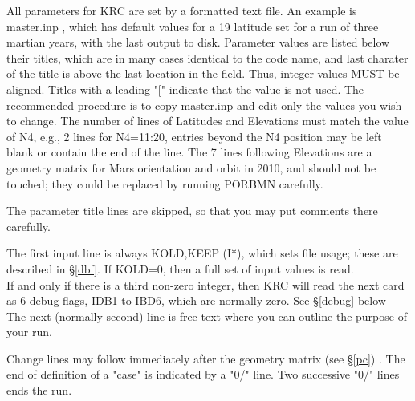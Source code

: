 \documentclass[draft]{article}  %
\newcommand{\qi}{\\ \hspace*{2.em}}      %
\begin{document}
All parameters for KRC are set by a formatted text file.  An example is
master.inp , which has default values for a 19 latitude set for a run of three
martian years, with the last output to disk. Parameter values are listed below
their titles, which are in many cases identical to the code name, and last
charater of the title is above the last location in the field. Thus, integer
values MUST be aligned. Titles with a leading "[" indicate that the value is not
used. The recommended procedure is to copy master.inp and edit only the values
you wish to change. The number of lines of Latitudes and Elevations must match
the value of N4, e.g., 2 lines for N4=11:20, entries beyond the N4 position may
be left blank or contain the end of the line. The 7 lines following Elevations
are a geometry matrix for Mars orientation and orbit in 2010, and should not be
touched; they could be replaced by running PORBMN carefully.

The parameter title lines are skipped, so that you may put comments there carefully.

The first input line is always KOLD,KEEP (I*), which sets file usage; these are
described in \S \ref{dbf}. If KOLD=0, then a full set of input values is read.
\qi If and only if there is a third non-zero integer, then KRC will read the next
card as 6 debug flags, IDB1 to IBD6, which are normally zero.
  See \S \ref{debug} below \\
The next (normally second) line is free text where you can outline the purpose 
of your run.

Change lines may follow immediately after the geometry matrix (see \S \ref{pc})
. The end of definition of a "case" is indicated by a "0/" line. Two successive
"0/" lines ends the run.
\end{document}
